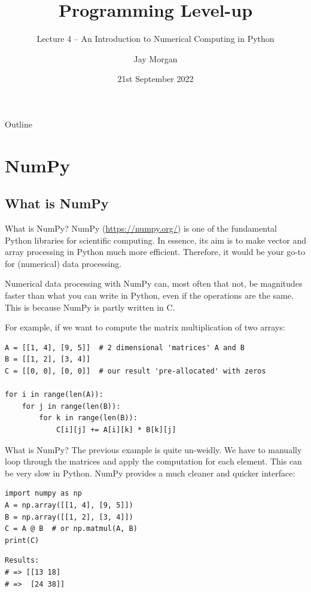 \documentclass[10pt]{beamer}
\author{Jay Morgan}
\date{21st September 2022}
\title{Programming Level-up}
\subtitle{Lecture 4 -- An Introduction to Numerical Computing in Python}
\begin{document}
\maketitle
\begin{frame}{Outline}
\tableofcontents
\end{frame}


\section{NumPy}
\label{sec:orga0fe9eb}

\subsection{What is NumPy}
\label{sec:orga11af75}

\begin{frame}[label={sec:org012091d},fragile]{What is NumPy?}
 NumPy (\url{https://numpy.org/}) is one of the fundamental Python libraries for scientific
computing. In essence, its aim is to make vector and array processing in Python much
more efficient. Therefore, it would be your go-to for (numerical) data
processing.

Numerical data processing with NumPy can, most often that not, be magnitudes faster
than what you can write in Python, even if the operations are the same. This is
because NumPy is partly written in C.

For example, if we want to compute the matrix multiplication of two arrays:

\begin{verbatim}
A = [[1, 4], [9, 5]]  # 2 dimensional 'matrices' A and B
B = [[1, 2], [3, 4]]
C = [[0, 0], [0, 0]]  # our result 'pre-allocated' with zeros

for i in range(len(A)):
    for j in range(len(B)):
        for k in range(len(B)):
            C[i][j] += A[i][k] * B[k][j]
\end{verbatim}
\end{frame}

\begin{frame}[label={sec:orgbde2806},fragile]{What is NumPy?}
 The previous example is quite un-weidly. We have to manually loop through the
matrices and apply the computation for each element. This can be \alert{very} slow in
Python. NumPy provides a much cleaner and quicker interface:

\begin{verbatim}
import numpy as np
A = np.array([[1, 4], [9, 5]])
B = np.array([[1, 2], [3, 4]])
C = A @ B  # or np.matmul(A, B)
print(C)
\end{verbatim}

\begin{verbatim}
Results: 
# => [[13 18]
# =>  [24 38]]
\end{verbatim}
\end{frame}
\end{document}
